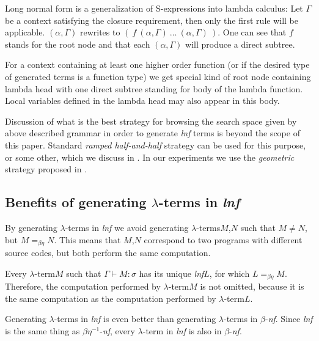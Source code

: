 \documentclass{sig-alternate}
\newcommand{\lterm}{$\lambda$-term\xspace}
\newcommand{\lterms}{$\lambda$-terms\xspace}
\newcommand{\turst}[3]{$#1\vdash{}#2:#3$\xspace}
\newcommand{\GMS}{\turst{\Gamma}{M}{\sigma}}
\newcommand{\bnf}{$\beta$-\textit{nf}\xspace}
\newcommand{\beenf}{$\beta\eta^{-1}$-\textit{nf}\xspace}
\newcommand{\lnf}{\textit{lnf}\xspace}
\begin{document}

Long normal form is a generalization of S-expressions into lambda calculus:
Let $\Gamma$ be a context satisfying the closure requirement, then only
the first rule will be applicable. 
$(\alpha, \Gamma)$ rewrites to $(~f~( \alpha, \Gamma )~\dots~( \alpha, \Gamma )~)$.
One can see that $f$ stands for 
the root node and that each $( \alpha , \Gamma )$ will produce a direct subtree. 

For a context containing at least one higher order function 
(or if the desired type of generated terms is a function type) we get special kind of root node containing lambda head with one direct subtree standing for body of the lambda function. Local variables defined in the lambda head may also appear in this body. 


Discussion of what is the best strategy for browsing the search space given by above described grammar in order to generate \lnf terms is beyond the scope of this paper. Standard \textit{ramped half-and-half} strategy can be used for this purpose, or some other, 
which we discuss in \cite{nasecec}. In our experiments we use the \textit{geometric} strategy proposed in 
\cite{nasecec}.


\subsection{Benefits of generating \lterms in \lnf}
\label{benefits}

By generating \lterms in \textit{lnf} we avoid generating 
\lterms $M$,$N$ such that $M \not= N$, but $M =_{\beta\eta} N$.
This means that $M$,$N$ correspond to two programs with different source codes, but both perform the same computation.

Every \lterm $M$ such that \GMS has its unique \lnf $L$, 
for which $L =_{\beta\eta} M$.
Therefore, the computation performed by \lterm $M$ 
is not omitted, because it is the same computation
as the computation performed by \lterm $L$. 

Generating \lterms in \lnf is even better than generating 
\lterms in \bnf. Since \lnf is the same thing as \beenf,
every \lterm in \lnf is also in \bnf. 
\end{document}
